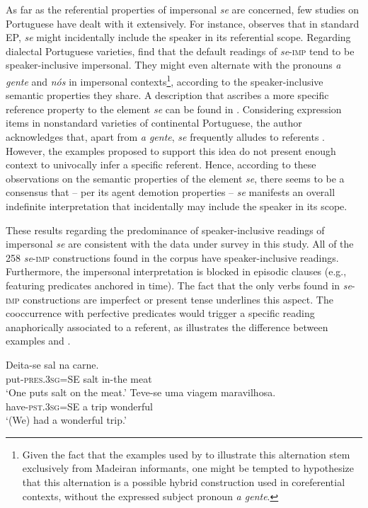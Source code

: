 \documentclass[output=paper]{langscibook}
\begin{document}
As far as the referential properties of impersonal \textit{se} are concerned, few studies on Portuguese have dealt with it extensively. For instance, \citet{Naro1976} observes that in standard EP, \textit{se} might incidentally include the speaker in its referential scope. Regarding dialectal Portuguese varieties, \citet{PosioVilkuna2013} find that the default readings of \textit{se}-\textsc{imp} tend to be speaker-inclusive impersonal. They might even alternate with the  pronouns \textit{a gente} and \textit{nós} in impersonal contexts\footnote{Given the fact that the examples used by \citet[211--213]{PosioVilkuna2013} to illustrate this alternation stem exclusively from Madeiran informants, one might be tempted to hypothesize that this alternation is a possible hybrid construction used in coreferential contexts, without the expressed subject pronoun \textit{a gente}.}, according to the speaker-inclusive semantic properties they share. A description that ascribes a more specific reference property to the element \textit{se} can be found in \citet{Casteleiro1975}. Considering  expression items in nonstandard varieties of continental Portuguese, the author acknowledges that, apart from \textit{a gente}, \textit{se} frequently alludes to  referents \citep[65]{Casteleiro1975}. However, the examples proposed to support this idea do not present enough context to univocally infer a specific referent. Hence, according to these observations on the semantic properties of the element \textit{se}, there seems to be a consensus that  -- per its agent demotion properties --  \textit{se} manifests an overall indefinite interpretation that incidentally may include the speaker in its scope. 


These results regarding the predominance of speaker-inclusive readings of impersonal \textit{se} are consistent with the data under survey in this study. All of the 258 \textit{se}-\textsc{imp} constructions found in the corpus have speaker-inclusive readings. Furthermore, the impersonal interpretation is blocked in episodic clauses (e.g., featuring predicates anchored in time). The fact that the only verbs found in \textit{se}-\textsc{imp} constructions are imperfect or present tense underlines this aspect. The cooccurrence with perfective predicates would trigger a specific reading anaphorically associated to a  referent, as illustrates the difference between examples  and . 

\ea\label{ex:henriques:16}
 \gll Deita-se sal na carne.\\
         put-\textsc{pres.3sg}=SE salt in-the meat\\
 \glt `One puts salt on the meat.'
\ex\label{ex:henriques:17}
 \gll Teve-se uma viagem maravilhosa.\\
         have-\textsc{pst.3sg}=SE a trip wonderful\\
 \glt `(We) had a wonderful trip.'
\z 
\end{document}
